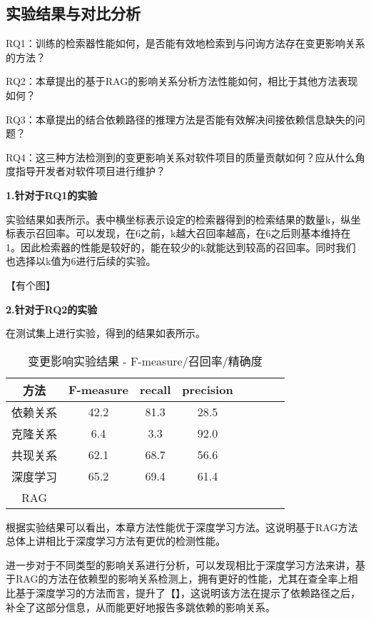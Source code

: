 \subsection{实验结果与对比分析}


RQ1：训练的检索器性能如何，是否能有效地检索到与问询方法存在变更影响关系的方法？

RQ2：本章提出的基于RAG的影响关系分析方法性能如何，相比于其他方法表现如何？

RQ3：本章提出的结合依赖路径的推理方法是否能有效解决间接依赖信息缺失的问题？

RQ4：这三种方法检测到的变更影响关系对软件项目的质量贡献如何？应从什么角度指导开发者对软件项目进行维护？

\textbf{1.针对于RQ1的实验}

实验结果如表所示。表中横坐标表示设定的检索器得到的检索结果的数量k，纵坐标表示召回率。可以发现，在6之前，k越大召回率越高，在6之后则基本维持在1。因此检索器的性能是较好的，能在较少的k就能达到较高的召回率。同时我们也选择以k值为6进行后续的实验。

【有个图】

\textbf{2.针对于RQ2的实验}

在测试集上进行实验，得到的结果如表所示。

\begin{table}[htbp]
\caption{变更影响实验结果 - F-measure/召回率/精确度}
\vspace{0.5em}\centering\wuhao
\begin{tabular}{cccccccc}
\toprule
方法 & F-measure & recall & precision  \\
\midrule
依赖关系 & 42.2 & 81.3 & 28.5  \\
克隆关系 & 6.4 & 3.3 &  92.0 \\
共现关系 & 62.1 & 68.7 & 56.6 \\
深度学习 & 65.2 & 69.4 & 61.4 \\
RAG &  &  &  \\
\bottomrule
\end{tabular}
\end{table}

根据实验结果可以看出，本章方法性能优于深度学习方法。这说明基于RAG方法总体上讲相比于深度学习方法有更优的检测性能。

进一步对于不同类型的影响关系进行分析，可以发现相比于深度学习方法来讲，基于RAG的方法在依赖型的影响关系检测上，拥有更好的性能，尤其在查全率上相比基于深度学习的方法而言，提升了【】，这说明该方法在提示了依赖路径之后，补全了这部分信息，从而能更好地报告多跳依赖的影响关系。

